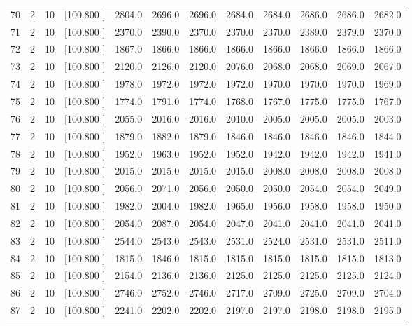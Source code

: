 \documentclass[12pt,a4paper]{article}
\begin{document}
\begin{center}
{\begin{tabular}{r r r r r r r r r r r r}
  70&  2& 10&[100.800   ]&  2804.0&  2696.0&  2696.0&  2684.0&  2684.0&  2686.0&  2686.0&  2682.0\\[-0.02in]
  71&  2& 10&[100.800   ]&  2370.0&  2390.0&  2370.0&  2370.0&  2370.0&  2389.0&  2379.0&  2370.0\\[-0.02in]
  72&  2& 10&[100.800   ]&  1867.0&  1866.0&  1866.0&  1866.0&  1866.0&  1866.0&  1866.0&  1866.0\\[-0.02in]
  73&  2& 10&[100.800   ]&  2120.0&  2126.0&  2120.0&  2076.0&  2068.0&  2068.0&  2069.0&  2067.0\\[-0.02in]
  74&  2& 10&[100.800   ]&  1978.0&  1972.0&  1972.0&  1972.0&  1970.0&  1970.0&  1970.0&  1969.0\\[-0.02in]
  75&  2& 10&[100.800   ]&  1774.0&  1791.0&  1774.0&  1768.0&  1767.0&  1775.0&  1775.0&  1767.0\\[-0.02in]
  76&  2& 10&[100.800   ]&  2055.0&  2016.0&  2016.0&  2010.0&  2005.0&  2005.0&  2005.0&  2003.0\\[-0.02in]
  77&  2& 10&[100.800   ]&  1879.0&  1882.0&  1879.0&  1846.0&  1846.0&  1846.0&  1846.0&  1844.0\\[-0.02in]
  78&  2& 10&[100.800   ]&  1952.0&  1963.0&  1952.0&  1952.0&  1942.0&  1942.0&  1942.0&  1941.0\\[-0.02in]
  79&  2& 10&[100.800   ]&  2015.0&  2015.0&  2015.0&  2015.0&  2008.0&  2008.0&  2008.0&  2008.0\\[-0.02in]
  80&  2& 10&[100.800   ]&  2056.0&  2071.0&  2056.0&  2050.0&  2050.0&  2054.0&  2054.0&  2049.0\\[-0.02in]
  81&  2& 10&[100.800   ]&  1982.0&  2004.0&  1982.0&  1965.0&  1956.0&  1958.0&  1958.0&  1950.0\\[-0.02in]
  82&  2& 10&[100.800   ]&  2054.0&  2087.0&  2054.0&  2047.0&  2041.0&  2041.0&  2041.0&  2041.0\\[-0.02in]
  83&  2& 10&[100.800   ]&  2544.0&  2543.0&  2543.0&  2531.0&  2524.0&  2531.0&  2531.0&  2511.0\\[-0.02in]
  84&  2& 10&[100.800   ]&  1815.0&  1846.0&  1815.0&  1815.0&  1815.0&  1815.0&  1815.0&  1813.0\\[-0.02in]
  85&  2& 10&[100.800   ]&  2154.0&  2136.0&  2136.0&  2125.0&  2125.0&  2125.0&  2125.0&  2124.0\\[-0.02in]
  86&  2& 10&[100.800   ]&  2746.0&  2752.0&  2746.0&  2717.0&  2709.0&  2725.0&  2709.0&  2704.0\\[-0.02in]
  87&  2& 10&[100.800   ]&  2241.0&  2202.0&  2202.0&  2197.0&  2197.0&  2198.0&  2198.0&  2195.0\\[-0.02in]

\end{tabular}}
\end{center}
\end{document}
